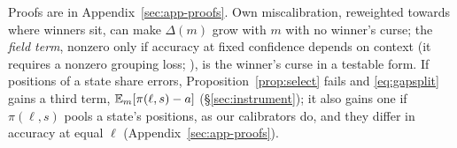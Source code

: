 Proofs are in Appendix~\ref{sec:app-proofs}. Own miscalibration, reweighted towards where
winners sit, can make $\Delta(m)$ grow with $m$ with no winner's curse; the \emph{field term},
nonzero only if accuracy at fixed confidence depends on context (it requires a nonzero
grouping loss; \citealp{kull2015decomp,perezlebel2023grouping}), is the winner's curse in a
testable form. If positions of a state share errors, Proposition~\ref{prop:select} fails and
\eqref{eq:gapsplit} gains a third term, $\mathbb{E}_m[\pi(\ell,s)-a]$ (\S\ref{sec:instrument}); it also gains one if
$\pi(\ell,s)$ pools a state's positions, as our calibrators do, and they differ in accuracy at equal $\ell$ (Appendix~\ref{sec:app-proofs}).
